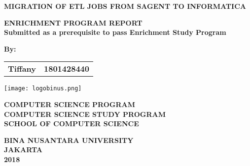 \renewcommand{\baselinestretch}{1.5}\normalsize
    \begin{center}
        \textbf{MIGRATION OF ETL JOBS FROM SAGENT TO INFORMATICA}
        
        \vspace{1.5cm}
        \textbf{ENRICHMENT PROGRAM REPORT}\\
        \textbf{Submitted as a prerequisite to pass Enrichment Study Program}
        
        \vspace{1cm}
        \textbf{By:}
        
        \begin{tabular}{ll}
        \textbf{Tiffany} & \textbf{1801428440}
        \end{tabular}
         
        \vfill
        
        \texttt{[image: logobinus.png]}
        
        \vspace{4cm}
        \textbf{COMPUTER SCIENCE PROGRAM}\\
        \textbf{COMPUTER SCIENCE STUDY PROGRAM}\\
        \textbf{SCHOOL OF COMPUTER SCIENCE}	
        
		\vspace{1.5cm}        
        
        \textbf{BINA NUSANTARA UNIVERSITY}\\
        \textbf{JAKARTA}\\
        \textbf{2018}
    \end{center}